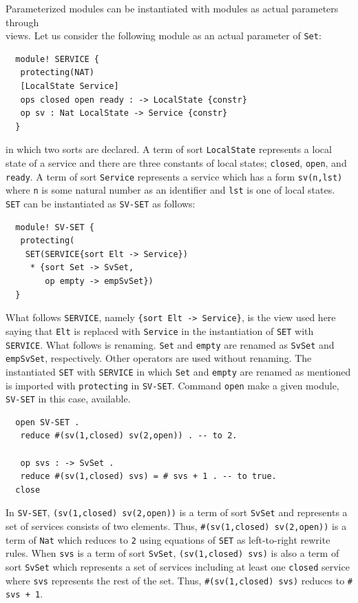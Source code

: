 \documentclass[12pt]{report}
\newcommand{\stt}[1]{{\small{\tt {#1}}}}
\begin{document}
Parameterized modules can be instantiated with modules as actual
parameters through\\ views. Let us consider the following module
as an actual parameter of {\tt Set}:
\begin{verbatim}
  module! SERVICE {
   protecting(NAT)
   [LocalState Service]
   ops closed open ready : -> LocalState {constr}
   op sv : Nat LocalState -> Service {constr}
  }
\end{verbatim}
in which two sorts are declared.  A term of sort {\tt LocalState}
represents a local state of a service and there are three constants of
local states; {\tt closed}, {\tt open}, and {\tt ready}.  A term of
sort {\tt Service} represents a service which has a form
\stt{sv(n,lst)} where {\tt n} is some natural number as an identifier
and {\tt lst} is one of local states.  {\tt SET} can be instantiated
as {\tt SV-SET} as follows:
\begin{verbatim}
  module! SV-SET {
   protecting(
    SET(SERVICE{sort Elt -> Service})
     * {sort Set -> SvSet,
        op empty -> empSvSet})
  }
\end{verbatim}
What follows {\tt SERVICE}, namely \stt{\{sort Elt -> Service\}}, is
the view used here saying that {\tt Elt} is replaced with
{\tt Service} in the instantiation of {\tt SET} with
{\tt SERVICE}. What follows {\tt *} is renaming. {\tt Set} and
{\tt empty} are renamed as {\tt SvSet} and {\tt empSvSet},
respectively. Other operators are used without renaming.
The instantiated {\tt SET} with {\tt SERVICE} in which {\tt Set} and
{\tt empty} are renamed as mentioned is imported with {\tt protecting}
in {\tt SV-SET}. Command {\tt open} make a given module, {\tt SV-SET}
in this case, available.
\begin{verbatim}
  open SV-SET .
   reduce #(sv(1,closed) sv(2,open)) . -- to 2.

   op svs : -> SvSet .
   reduce #(sv(1,closed) svs) = # svs + 1 . -- to true.
  close
\end{verbatim}
In {\tt SV-SET}, \stt{(sv(1,closed) sv(2,open))} is a term of sort
{\tt SvSet} and represents a set of services consists of two elements.
Thus, \stt{\#(sv(1,closed) sv(2,open))} is a term of {\tt Nat} which
reduces to {\tt 2} using equations of {\tt SET} as left-to-right
rewrite rules. When {\tt svs} is a term of sort {\tt SvSet},
\stt{(sv(1,closed) svs)} is also a term of sort {\tt SvSet} which
represents a set of services including at least one {\tt closed}
service where {\tt svs} represents the rest of the set. Thus,
\stt{\#(sv(1,closed) svs)} reduces to \stt{\# svs + 1}.
\end{document}
